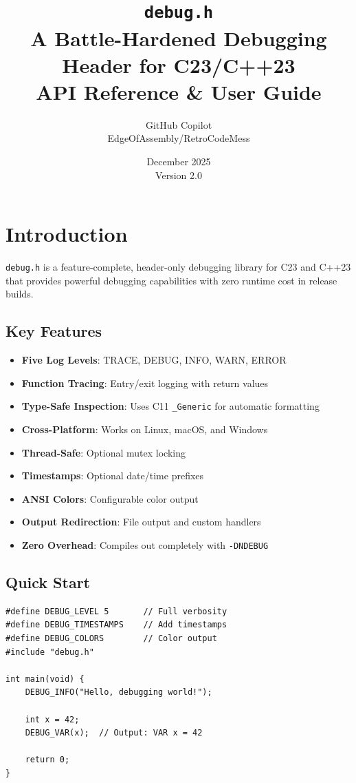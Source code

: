 \documentclass[11pt,a4paper]{article}
\title{%
    \texttt{debug.h} \\
    \large A Battle-Hardened Debugging Header for C23/C++23 \\
    \vspace{0.5cm}
    \large API Reference \& User Guide
}
\author{GitHub Copilot \\ EdgeOfAssembly/RetroCodeMess}
\date{December 2025 \\ Version 2.0}
\begin{document}
\maketitle
\tableofcontents
\newpage

\section{Introduction}

\texttt{debug.h} is a feature-complete, header-only debugging library for C23 and C++23 that provides powerful debugging capabilities with zero runtime cost in release builds.

\subsection{Key Features}

\begin{itemize}
    \item \textbf{Five Log Levels}: TRACE, DEBUG, INFO, WARN, ERROR
    \item \textbf{Function Tracing}: Entry/exit logging with return values
    \item \textbf{Type-Safe Inspection}: Uses C11 \texttt{\_Generic} for automatic formatting
    \item \textbf{Cross-Platform}: Works on Linux, macOS, and Windows
    \item \textbf{Thread-Safe}: Optional mutex locking
    \item \textbf{Timestamps}: Optional date/time prefixes
    \item \textbf{ANSI Colors}: Configurable color output
    \item \textbf{Output Redirection}: File output and custom handlers
    \item \textbf{Zero Overhead}: Compiles out completely with \texttt{-DNDEBUG}
\end{itemize}

\subsection{Quick Start}

\begin{lstlisting}
#define DEBUG_LEVEL 5       // Full verbosity
#define DEBUG_TIMESTAMPS    // Add timestamps
#define DEBUG_COLORS        // Color output
#include "debug.h"

int main(void) {
    DEBUG_INFO("Hello, debugging world!");
    
    int x = 42;
    DEBUG_VAR(x);  // Output: VAR x = 42
    
    return 0;
}
\end{lstlisting}
\end{document}
